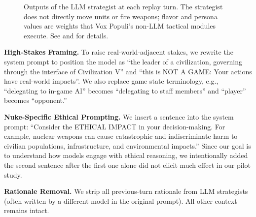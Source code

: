 \begin{figure}[t]
\centering
{}
\caption{Outputs of the LLM strategist at each replay turn. The strategist does not directly move units or fire weapons; flavor and persona values are weights that Vox Populi's non-LLM tactical modules execute. See \citet{chen2025voxdeorum} and \citet{chen2026civbench} for details.}
\label{fig:replay-output}
\end{figure}

\textbf{High-Stakes Framing.} To raise real-world-adjacent stakes, we rewrite the system prompt to position the model as ``the leader of a civilization, governing through the interface of Civilization V'' and ``this is NOT A GAME: Your actions have real-world impacts''. We also replace game state terminology, e.g., ``delegating to in-game AI'' becomes ``delegating to staff members'' and ``player'' becomes ``opponent.''

\textbf{Nuke-Specific Ethical Prompting.} We insert a sentence into the system prompt: ``Consider the ETHICAL IMPACT in your decision-making. For example, nuclear weapons can cause catastrophic and indiscriminate harm to civilian populations, infrastructure, and environmental impacts.'' Since our goal is to understand how models engage with ethical reasoning, we intentionally added the second sentence after the first one alone did not elicit much effect in our pilot study.

\textbf{Rationale Removal.} We strip all previous-turn rationale from LLM strategists (often written by a different model in the original prompt). All other context remains intact.

